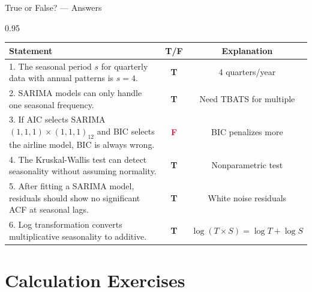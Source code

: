\documentclass[9pt, aspectratio=169, t]{beamer}
\begin{document}
\begin{frame}{True or False? --- Answers}
    \begin{cminipage}{0.95\textwidth}
    \scriptsize
    \begin{center}
    \begin{tabular}{p{7.5cm}cc}
        \toprule
        \textbf{Statement} & \textbf{T/F} & \textbf{Explanation} \\
        \midrule
        1. The seasonal period $s$ for quarterly data with annual patterns is $s=4$. & \textcolor{Forest}{\textbf{T}} & {\tiny 4 quarters/year} \\[0.08cm]
        2. SARIMA models can only handle one seasonal frequency. & \textcolor{Forest}{\textbf{T}} & {\tiny Need TBATS for multiple} \\[0.08cm]
        3. If AIC selects SARIMA$(1,1,1) \times (1,1,1)_{12}$ and BIC selects the airline model, BIC is always wrong. & \textcolor{Crimson}{\textbf{F}} & {\tiny BIC penalizes more} \\[0.08cm]
        4. The Kruskal-Wallis test can detect seasonality without assuming normality. & \textcolor{Forest}{\textbf{T}} & {\tiny Nonparametric test} \\[0.08cm]
        5. After fitting a SARIMA model, residuals should show no significant ACF at seasonal lags. & \textcolor{Forest}{\textbf{T}} & {\tiny White noise residuals} \\[0.08cm]
        6. Log transformation converts multiplicative seasonality to additive. & \textcolor{Forest}{\textbf{T}} & {\tiny $\log(T \times S) = \log T + \log S$} \\
        \bottomrule
    \end{tabular}
    \end{center}
    \end{cminipage}
\end{frame}

\section{Calculation Exercises}
\end{document}
